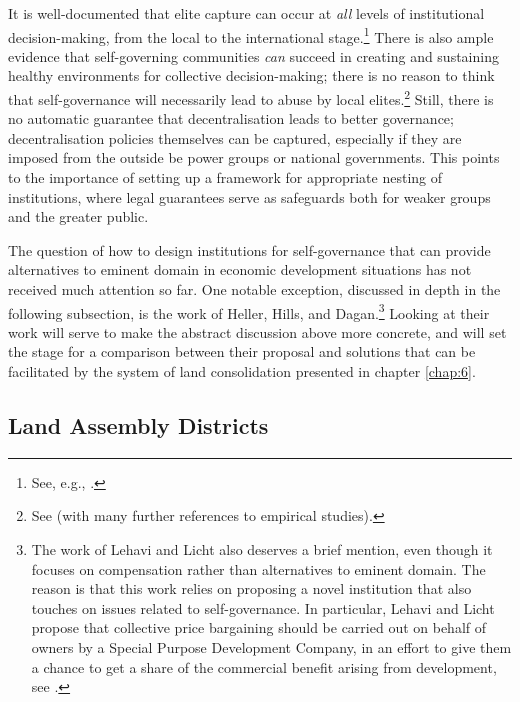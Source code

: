 It is well-documented that elite capture can occur at {\it all} levels of institutional decision-making, from the local to the international stage.\footnote{See, e.g., \cite{bardhan00,platteau05,cullet13,levien13,mehta14}.} There is also ample evidence that self-governing communities {\it can} succeed in creating and sustaining healthy environments for collective decision-making; there is no reason to think that self-governance will necessarily lead to abuse by local elites.\footnote{See \cite[72-75]{andersson08} (with many further references to empirical studies).} Still, there is no automatic guarantee that decentralisation leads to better governance; decentralisation policies themselves can be captured, especially if they are imposed from the outside be power groups or national governments. This points to the importance of setting up a framework for appropriate nesting of institutions, where legal guarantees serve as safeguards both for weaker groups and the greater public.

The question of how to design institutions for self-governance that can provide alternatives to eminent domain in economic development situations has not received much attention so far. One notable exception, discussed in depth in the following subsection, is the work of Heller, Hills, and Dagan.\footnote{The work of Lehavi and Licht also deserves a brief mention, even though it focuses on compensation rather than alternatives to eminent domain. The reason is that this work relies on proposing a novel institution that also touches on issues related to self-governance. In particular, Lehavi and Licht propose that collective price bargaining should be carried out on behalf of owners by a Special Purpose Development Company, in an effort to give them a chance to get a share of the commercial benefit arising from development, see \cite{lehavi07}.} Looking at their work will serve to make the abstract discussion above more concrete, and will set the stage for a comparison between their proposal and solutions that can be facilitated by the system of land consolidation presented in chapter \ref{chap:6}.

\subsection{Land Assembly Districts}\label{sec:3:6:1}

